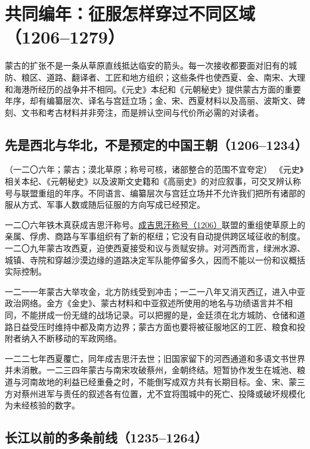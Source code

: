 \section{共同编年：征服怎样穿过不同区域（1206--1279）}

蒙古的扩张不是一条从草原直线抵达临安的箭头。每一次接收都要面对旧有的城防、粮区、道路、翻译者、工匠和地方组织；这些条件也使西夏、金、南宋、大理和海港所经历的战争并不相同。《元史》本纪和《元朝秘史》提供蒙古方面的重要年序，却有编纂层次、译名与宫廷立场；金、宋、西夏材料以及高丽、波斯文、碑刻、文书和考古材料并非旁注，而是辨认空间与代价所必需的对读者。

\subsection{先是西北与华北，不是预定的中国王朝（1206--1234）}

\begin{event}{（一二〇六年；蒙古；漠北草原；称号可核，诸部整合的范围不宜夸定）}
《元史》相关本纪、《元朝秘史》以及波斯文史籍和《高丽史》的对应叙事，可交叉辨认称号与联盟重组的年序。不同语言、编纂层次与宫廷立场并不允许我们把所有诸部的服从方式、军事人数或随后征服的方向写成已经预定。
\end{event}

一二〇六年铁木真获成吉思汗称号。\hyperlink{evt:YUAN-1206-EVENT-151}{成吉思汗称号（1206）}联盟的重组使草原上的亲属、俘虏、商路与军事组织有了新的枢纽；它没有自动提供跨区域征收的制度。一二〇九年蒙古攻西夏，迫使西夏接受和议与贡赋安排。对河西而言，绿洲水源、城镇、寺院和穿越沙漠边缘的道路决定军队能停留多久，因而不能以一份和议概括实际控制。

\label{evt:mongol-jin-frontier}
一二一一年蒙古大举攻金，北方防线受到冲击；一二一八年又消灭西辽，进入中亚政治网络。金方《金史》、蒙古材料和中亚叙述所使用的地名与功绩语言并不相同，不能拼成一份无缝的战场记录。可以把握的是，金廷须在北方城防、仓储和道路日益受压时维持中都及南方边界；蒙古方面也要将被征服地区的工匠、粮食和投附者纳入不断移动的军政网络。

一二二七年西夏覆亡，同年成吉思汗去世；旧国家留下的河西通道和多语文书世界并未消散。一二三四年蒙古与南宋攻破蔡州，金朝终结。短暂协作发生在城池、粮道与河南故地的利益已经重叠之时，不能倒写成双方共有长期目标。金、宋、蒙三方对蔡州进军与责任的叙述各有位置，尤不宜将围城中的死亡、投降或破坏规模化为未经核验的数字。

\subsection{长江以前的多条前线（1235--1264）}

